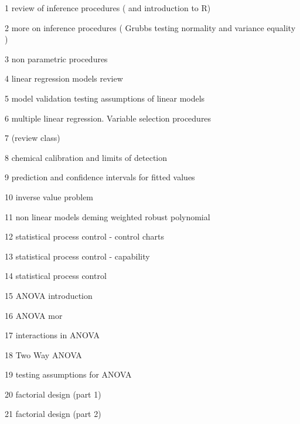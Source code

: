 
1 review of inference procedures ( and introduction to R)

2 more on inference procedures ( Grubbs testing normality and variance equality )

3 non parametric procedures

4 linear regression models review

5 model validation testing assumptions of linear models 

6 multiple linear regression. Variable selection procedures

7 (review class)

8 chemical calibration and limits of detection

9 prediction and confidence intervals for fitted values

10 inverse value problem

11 non linear models deming weighted robust polynomial

12 statistical process control - control charts

13 statistical process control - capability

14 statistical process control 

15 ANOVA introduction

16 ANOVA mor

17 interactions in ANOVA

18 Two Way ANOVA

19 testing assumptions for ANOVA

20 factorial design (part 1)

21 factorial design (part 2)



